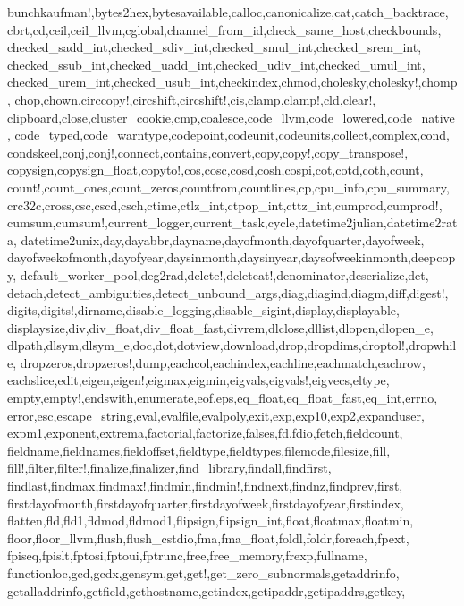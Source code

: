 {{bunchkaufman!,bytes2hex,bytesavailable,calloc,canonicalize,cat,catch_backtrace,%
cbrt,cd,ceil,ceil_llvm,cglobal,channel_from_id,check_same_host,checkbounds,%
checked_sadd_int,checked_sdiv_int,checked_smul_int,checked_srem_int,%
checked_ssub_int,checked_uadd_int,checked_udiv_int,checked_umul_int,%
checked_urem_int,checked_usub_int,checkindex,chmod,cholesky,cholesky!,chomp,%
chop,chown,circcopy!,circshift,circshift!,cis,clamp,clamp!,cld,clear!,%
clipboard,close,cluster_cookie,cmp,coalesce,code_llvm,code_lowered,code_native,%
code_typed,code_warntype,codepoint,codeunit,codeunits,collect,complex,cond,%
condskeel,conj,conj!,connect,contains,convert,copy,copy!,copy_transpose!,%
copysign,copysign_float,copyto!,cos,cosc,cosd,cosh,cospi,cot,cotd,coth,count,%
count!,count_ones,count_zeros,countfrom,countlines,cp,cpu_info,cpu_summary,%
crc32c,cross,csc,cscd,csch,ctime,ctlz_int,ctpop_int,cttz_int,cumprod,cumprod!,%
cumsum,cumsum!,current_logger,current_task,cycle,datetime2julian,datetime2rata,%
datetime2unix,day,dayabbr,dayname,dayofmonth,dayofquarter,dayofweek,%
dayofweekofmonth,dayofyear,daysinmonth,daysinyear,daysofweekinmonth,deepcopy,%
default_worker_pool,deg2rad,delete!,deleteat!,denominator,deserialize,det,%
detach,detect_ambiguities,detect_unbound_args,diag,diagind,diagm,diff,digest!,%
digits,digits!,dirname,disable_logging,disable_sigint,display,displayable,%
displaysize,div,div_float,div_float_fast,divrem,dlclose,dllist,dlopen,dlopen_e,%
dlpath,dlsym,dlsym_e,doc,dot,dotview,download,drop,dropdims,droptol!,dropwhile,%
dropzeros,dropzeros!,dump,eachcol,eachindex,eachline,eachmatch,eachrow,%
eachslice,edit,eigen,eigen!,eigmax,eigmin,eigvals,eigvals!,eigvecs,eltype,%
empty,empty!,endswith,enumerate,eof,eps,eq_float,eq_float_fast,eq_int,errno,%
error,esc,escape_string,eval,evalfile,evalpoly,exit,exp,exp10,exp2,expanduser,%
expm1,exponent,extrema,factorial,factorize,falses,fd,fdio,fetch,fieldcount,%
fieldname,fieldnames,fieldoffset,fieldtype,fieldtypes,filemode,filesize,fill,%
fill!,filter,filter!,finalize,finalizer,find_library,findall,findfirst,%
findlast,findmax,findmax!,findmin,findmin!,findnext,findnz,findprev,first,%
firstdayofmonth,firstdayofquarter,firstdayofweek,firstdayofyear,firstindex,%
flatten,fld,fld1,fldmod,fldmod1,flipsign,flipsign_int,float,floatmax,floatmin,%
floor,floor_llvm,flush,flush_cstdio,fma,fma_float,foldl,foldr,foreach,fpext,%
fpiseq,fpislt,fptosi,fptoui,fptrunc,free,free_memory,frexp,fullname,%
functionloc,gcd,gcdx,gensym,get,get!,get_zero_subnormals,getaddrinfo,%
getalladdrinfo,getfield,gethostname,getindex,getipaddr,getipaddrs,getkey,%
}}
